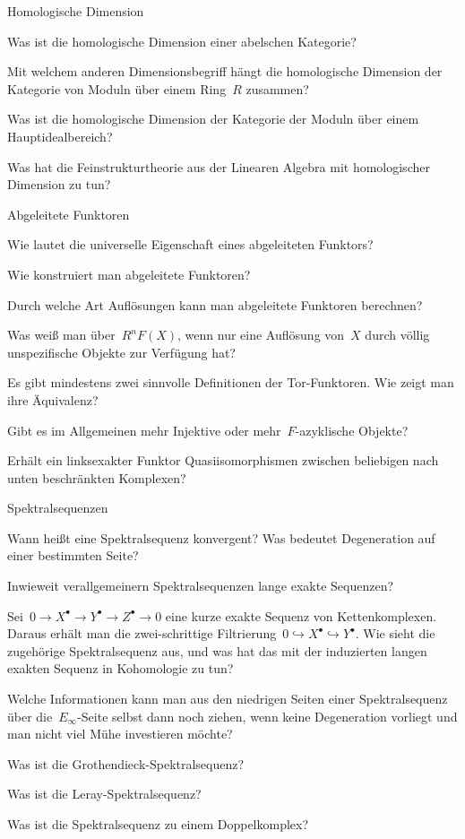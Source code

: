 \documentclass{uebblatt}
\begin{document}
\begin{aufgabeE}{Homologische Dimension}
\item Was ist die homologische Dimension einer abelschen Kategorie?
\item Mit welchem anderen Dimensionsbegriff hängt die homologische Dimension
der Kategorie von Moduln über einem Ring~$R$ zusammen?
\item Was ist die homologische Dimension der Kategorie der Moduln über einem
Hauptidealbereich?
\item Was hat die Feinstrukturtheorie aus der Linearen Algebra mit
homologischer Dimension zu tun?
\end{aufgabeE}

\begin{aufgabeE}{Abgeleitete Funktoren}
\item Wie lautet die universelle Eigenschaft eines abgeleiteten Funktors?
\item Wie konstruiert man abgeleitete Funktoren?
\item Durch welche Art Auflösungen kann man abgeleitete Funktoren berechnen?
\item Was weiß man über~$R^nF(X)$, wenn nur eine Auflösung von~$X$ durch völlig
unspezifische Objekte zur Verfügung hat?
\item Es gibt mindestens zwei sinnvolle Definitionen der Tor-Funktoren. Wie
zeigt man ihre Äquivalenz?
\item Gibt es im Allgemeinen mehr Injektive oder mehr~$F$-azyklische Objekte?
\item Erhält ein linksexakter Funktor Quasiisomorphismen zwischen beliebigen
nach unten beschränkten Komplexen?
\end{aufgabeE}

\begin{aufgabeE}{Spektralsequenzen}
\item Wann heißt eine Spektralsequenz konvergent? Was bedeutet Degeneration auf
einer bestimmten Seite?
\item Inwieweit verallgemeinern Spektralsequenzen lange exakte Sequenzen?
\item Sei~$0 \to X^\bullet \to Y^\bullet \to Z^\bullet \to 0$ eine kurze exakte
Sequenz von Kettenkomplexen. Daraus erhält man die zwei-schrittige
Filtrierung~$0 \hookrightarrow X^\bullet \hookrightarrow Y^\bullet$. Wie sieht
die zugehörige Spektralsequenz aus, und was hat das mit der induzierten langen
exakten Sequenz in Kohomologie zu tun?
\item Welche Informationen kann man aus den niedrigen Seiten einer
Spektralsequenz über die~$E_\infty$-Seite selbst dann noch ziehen, wenn keine
Degeneration vorliegt und man nicht viel Mühe investieren möchte?
\item Was ist die Grothendieck-Spektralsequenz?
\item Was ist die Leray-Spektralsequenz?
\item Was ist die Spektralsequenz zu einem Doppelkomplex?
\end{aufgabeE}
\end{document}
